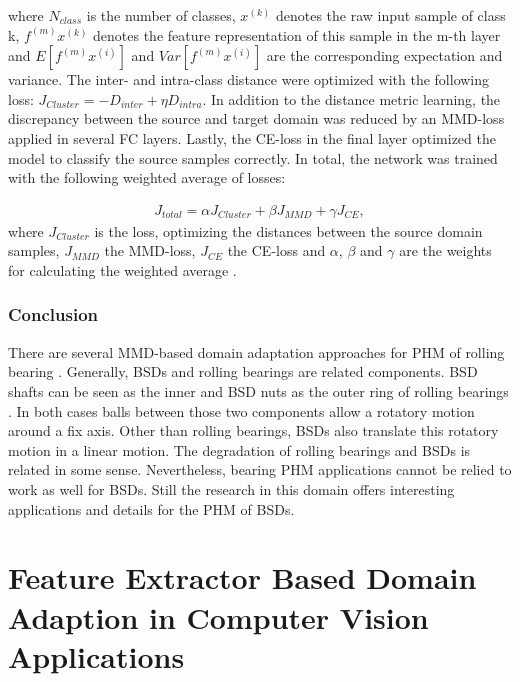 where $N_{class}$ is the number of classes, $x^{(k)}$ denotes the raw input sample of class k, $f^{(m)}x^{(k)}$ denotes the feature representation of this sample in the m-th layer and $E[f^{(m)}x^{(i)}]$ and $Var[f^{(m)}x^{(i)}]$ are the corresponding expectation and variance. The inter- and intra-class distance were optimized with the following loss: $J_{Cluster} = - D_{inter} + \eta D_{intra}$. In addition to the distance metric learning, the discrepancy between the source and target domain was reduced by an MMD-loss applied in several FC layers. Lastly, the CE-loss in the final layer optimized the model to classify the source samples correctly. In total, the network was trained with the following weighted average of losses: 

\begin{equation}
    \begin{aligned}
    J_{total} = \alpha J_{Cluster} + \beta J_{MMD} + \gamma J_{CE}, 
    \end{aligned}
\end{equation}
where $J_{Cluster}$ is the loss, optimizing the distances between the source domain samples, $J_{MMD}$ the MMD-loss,  $J_{CE}$ the CE-loss and $\alpha$, $\beta$ and $\gamma$ are the weights for calculating the weighted average \cite{Li2018}.

\subsubsection{Conclusion}
There are several MMD-based domain adaptation approaches for PHM of rolling bearing \cite{AN201942} \cite{Li2018} \cite{Guo2019} \cite{Singh2019} \cite{Kang2020}. Generally, BSDs and rolling bearings are related components. BSD shafts can be seen as the inner and BSD nuts as the outer ring of rolling bearings \cite{Lee2015}. In both cases balls between those two components allow a rotatory motion around a fix axis. Other than rolling bearings, BSDs also translate this rotatory motion in a linear motion. The degradation of rolling bearings and BSDs is related in some sense. Nevertheless, bearing PHM applications cannot be relied to work as well for BSDs. Still the research in this domain offers interesting applications and details for the PHM of BSDs. 

\section{Feature Extractor Based Domain Adaption in Computer Vision Applications}

